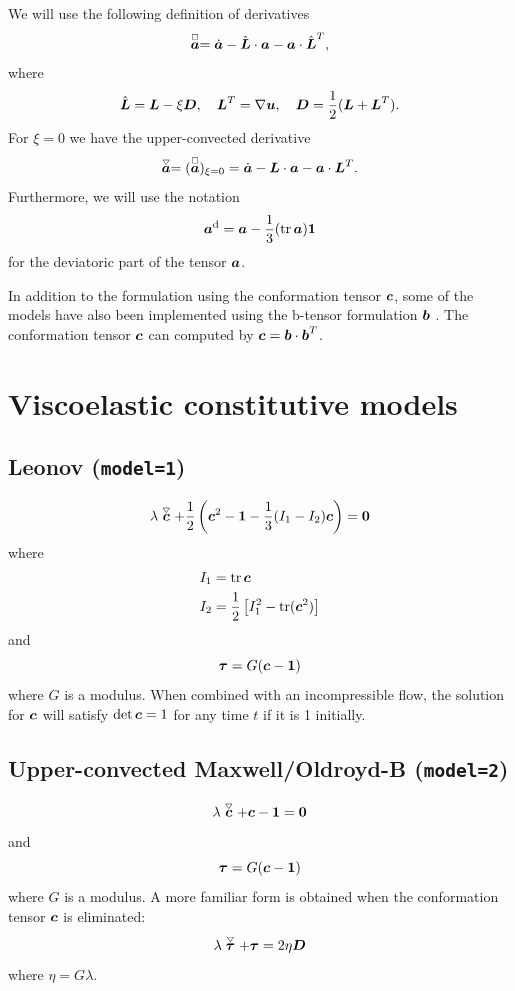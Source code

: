 We will use the following definition of derivatives
\[
  \stackrel{\scriptscriptstyle\Box}{\boldsymbol{a}}=\dot{\boldsymbol{a}}-\hat{\boldsymbol{L}}\cdot\boldsymbol{a}
                    -\boldsymbol{a}\cdot\hat{\boldsymbol{L}}^T,
\]
where
\[
    \hat{\boldsymbol{L}}=\boldsymbol{L}-\xi\boldsymbol{D},\quad\boldsymbol{L}^T=
          \nabla\boldsymbol{u},\quad\boldsymbol{D}=\frac12(\boldsymbol{L} + \boldsymbol{L}^T).
\]
For $\xi=0$ we have the upper-convected derivative
\[
  \stackrel{\scriptscriptstyle\bigtriangledown}{\boldsymbol{a}}=(\stackrel{\scriptscriptstyle\Box}{\boldsymbol{a}})_{\xi=0}=
             \dot{\boldsymbol{a}} -\boldsymbol{L}\cdot\boldsymbol{a}
                    -\boldsymbol{a}\cdot\boldsymbol{L}^T.
\]
Furthermore, we will use the notation
\[
\boldsymbol{a}^{\text{d}}=\boldsymbol{a}-\frac13(\operatorname{tr}\boldsymbol{a})\boldsymbol{1}
\]
for the deviatoric part of the tensor $\boldsymbol{a}$.

In addition to the formulation using the conformation tensor $\boldsymbol{c}$, some of
the models have also been implemented using the b-tensor formulation $\boldsymbol{b}$ \cite{hutter_fluctuating_2018}. The conformation tensor $\boldsymbol{c}$ can computed by $\boldsymbol{c}=\boldsymbol{b}\cdot\boldsymbol{b}^T$. 
 
\section{Viscoelastic constitutive models} 

\newcommand{\model}[2]{
    \subsection{#2 \textmd{(\texttt{model=#1})}}
}

\model{1}{Leonov}
\[
  \lambda\stackrel{\scriptscriptstyle\bigtriangledown}{\boldsymbol{c}}+\frac12\left({\boldsymbol{c}}^2-\boldsymbol{1}
                   -\frac13(I_{1}-I_{2}){\boldsymbol{c}}\right) = \boldsymbol{0}
\]
where
\begin{align*}
    I_{1}&=\operatorname{tr}{\boldsymbol{c}}\\
    I_{2}&=\frac12\left[I_{1}^2-\operatorname{tr}({\boldsymbol{c}}^2)\right]
\end{align*}
and
\[
     \boldsymbol{\tau}=G(\boldsymbol{c} - \boldsymbol{1})
\]
where $G$ is a modulus. When combined with an incompressible flow, the solution for $\boldsymbol{c}$ will satisfy $\det\boldsymbol{c}=1$ for any time $t$ if it is 1 initially.

\model{2}{Upper-convected Maxwell/Oldroyd-B}
\label{sec:appucm}
\[
  \lambda\stackrel{\scriptscriptstyle\bigtriangledown}{\boldsymbol{c}}+\boldsymbol{c}-\boldsymbol{1}=\boldsymbol{0}
\]
and
\[
     \boldsymbol{\tau}=G(\boldsymbol{c} - \boldsymbol{1})
\]
where $G$ is a modulus. A more familiar form is obtained when
the conformation tensor $\boldsymbol{c}$ is eliminated:
\[
  \lambda\stackrel{\scriptscriptstyle\bigtriangledown}{\boldsymbol{\tau}}+\boldsymbol{\tau}=2\eta\boldsymbol{D}
\]
where $\eta=G\lambda$.

